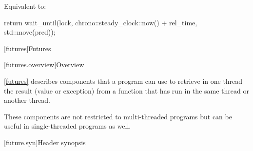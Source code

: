 \begin{itemdescr}
\pnum
\effects Equivalent to:
\begin{codeblock}
return wait_until(lock, chrono::steady_clock::now() + rel_time, std::move(pred));
\end{codeblock}
\end{itemdescr}

[futures]{Futures}

[futures.overview]{Overview}

\pnum
\ref{futures} describes components that a \Cpp{} program can use to retrieve in one thread the
result (value or exception) from a function that has run in the same thread or another thread.
\begin{note} These components are not restricted to multi-threaded programs but can be useful in
single-threaded programs as well. \end{note}

[future.syn]{Header  synopsis}

